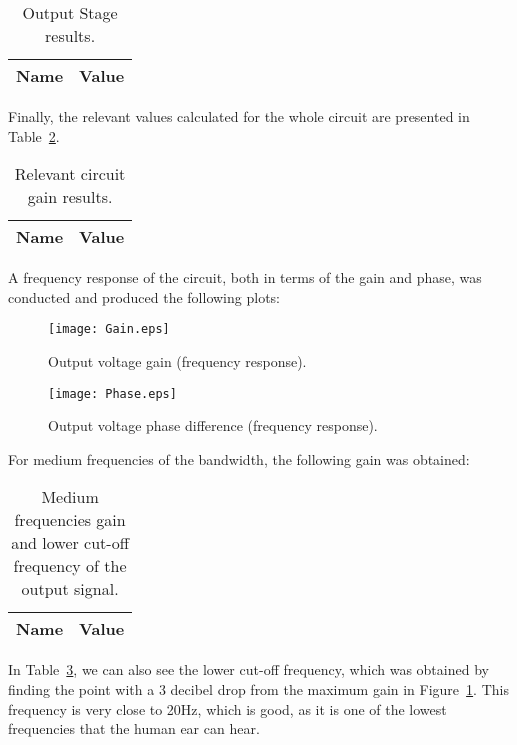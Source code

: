 \begin{table}[h]
  \centering
  \begin{tabular}{|l|r|}
    \hline    
    {\bf Name} & {\bf Value} \\ \hline
    
  \end{tabular}
  \caption{Output Stage results.}
  \label{tab:opstage}
\end{table}



Finally, the relevant values calculated for the whole circuit are presented in Table~\ref{tab:total}.


\begin{table}[h]
  \centering
  \begin{tabular}{|l|r|}
    \hline    
    {\bf Name} & {\bf Value} \\ \hline
    
  \end{tabular}
  \caption{Relevant circuit gain results.}
  \label{tab:total}
\end{table}

A frequency response of the circuit, both in terms of the gain and phase, was conducted and produced the following plots: 


\begin{figure}[h] \centering
\texttt{[image: Gain.eps]}
	\caption{Output voltage gain (frequency response).}
\label{fig:gain}
\end{figure}


\begin{figure}[h] \centering
\texttt{[image: Phase.eps]}
	\caption{Output voltage phase difference (frequency response).}
\label{fig:phase}
\end{figure}


For medium frequencies of the bandwidth, the following gain was obtained:

\begin{table}[h]
  \centering
  \begin{tabular}{|l|r|}
    \hline    
    {\bf Name} & {\bf Value} \\ \hline
    
  \end{tabular}
  \caption{Medium frequencies gain and lower cut-off frequency of the output signal.}
  \label{tab:simtab}
\end{table}


In Table~\ref{tab:simtab}, we can also see the lower cut-off frequency, which was obtained by finding the point with a 3 decibel drop from the maximum gain in Figure~\ref{fig:gain}. This frequency is very close to 20Hz, which is good, as it is one of the lowest frequencies that the human ear can hear.
